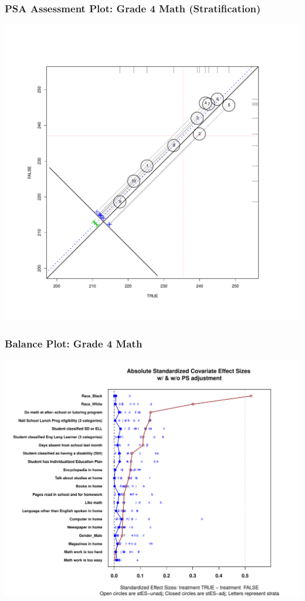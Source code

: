 \documentclass[10pt,handout,mathserif]{beamer}
\begin{document}
\begin{frame}[c]
	\frametitle{PSA Assessment Plot: Grade 4 Math (Stratification)}
	\begin{center}
	\includegraphics[height=0.9\textheight,keepaspectratio]{../Figures2009/g4math-circpsa10}
	\end{center}
\end{frame}

\begin{frame}[c]
	\frametitle{Balance Plot: Grade 4 Math}
	\begin{center}
	\includegraphics[height=0.86\textheight,keepaspectratio]{../Figures2009/g4math-lr-balance.pdf}
	\end{center}
\end{frame}
\end{document}
